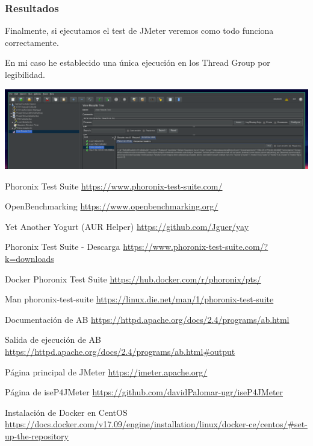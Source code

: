 \documentclass[12pt, spanish]{article}
\begin{document}
\subsubsection{Resultados}

Finalmente, si ejecutamos el test de JMeter veremos como todo funciona correctamente.

En mi caso he establecido una única ejecución en los Thread Group por legibilidad.

\begin{center}
\includegraphics[scale=0.25]{jmeter-10.png}
\end{center}


\newpage

\begin{thebibliography}{9}

Phoronix Test Suite \url{https://www.phoronix-test-suite.com/}

OpenBenchmarking \url{https://www.openbenchmarking.org/}

Yet Another Yogurt (AUR Helper) \url{https://github.com/Jguer/yay}

Phoronix Test Suite - Descarga \url{https://www.phoronix-test-suite.com/?k=downloads}

Docker Phoronix Test Suite \url{https://hub.docker.com/r/phoronix/pts/}

Man phoronix-test-suite \url{https://linux.die.net/man/1/phoronix-test-suite}


Documentación de AB \url{https://httpd.apache.org/docs/2.4/programs/ab.html}

Salida de ejecución de AB \url{https://httpd.apache.org/docs/2.4/programs/ab.html#output}

Página principal de JMeter \url{https://jmeter.apache.org/}

Página de iseP4JMeter \url{https://github.com/davidPalomar-ugr/iseP4JMeter}

Instalación de Docker en CentOS \url{https://docs.docker.com/v17.09/engine/installation/linux/docker-ce/centos/#set-up-the-repository}

\end{thebibliography}
\end{document}
